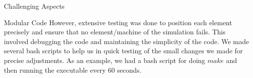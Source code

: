 \documentclass[a4paper,12pt]{article}
\begin{document}
\begin{section}{Challenging Aspects}
\begin{subsection}{Modular Code}
\linebreak
\linebreak
However, extensive testing was done to position each element precisely and ensure that no element/machine of the simulation fails. This involved debugging the code and maintaining the simplicity of the code.
\linebreak
\linebreak
We made several bash scripts to help us in quick testing of the small changes we made for precise adjustments. As an example, we had a bash script for doing \(make\) and  then running the executable every 60 seconds.
\end{subsection}
\end{section}
\bigskip
\pagebreak


    {}
    \cite{website:bod}
    \cite{website:coll}
    \cite{website:fix}
    \cite{website:user}
    \cite{wiki:001}
    \cite{wiki:002}
    \cite{wiki:000}
    \cite{website:you}
\bigskip
\end{document}
